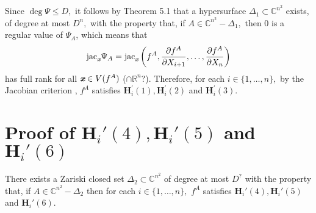 \documentclass[sigconf]{acmart}
\def\xb{\textit{\textbf{x}}}
\def\C{\mathbb{C}}
\def\R{\mathbb{R}}
\def\jac{ \textrm{jac}}
\def\pa{\partial}
\begin{document}
%
Since $\deg \Psi \leq D,$ it follows by Theorem 5.1 that a hypersurface $\Delta_1 \subset \C^{n^2}$ exists, of degree at most $D^n,$ with the property that, if $A \in \C^{n^2}-\Delta_1,$ then $0$ is a regular value of $\Psi_{A}$, which means that 
\[
\jac_\textit{\textbf{x}} \Psi_A 
= \jac_\xb \left(f^A,\frac{\pa f^A}{\pa X_{i+1}},\hdots,\frac{\pa f^A}{\pa X_n}\right)
\] 
has full rank for all $\xb \in V(f^A)$ ($\cap \R^n$?). Therefore, for each $i \in \{1,\hdots,n\},$ by the Jacobian criterion \cite[Theorem 16.19]{ECA}, $f^A$ satisfies $\textbf{H}_i^{'}(1),\textbf{H}_i^{'}(2)$ and $\textbf{H}_i^{'}(3)$.%
%
%
%
\section{Proof of $\textbf{H}_i'(4),\textbf{H}_i'(5)$ and $\textbf{H}_i'(6)$}
%
\begin{theorem}
There exists a Zariski closed set $\Delta_2 \subset \C^{n^2}$ of degree at most $D^{\textrm{?}}$ with the property that, if $A \in \C^{n^2} - \Delta_2$ then for each $i \in \{1,\hdots,n\},$ $f^A$ satisfies $\textbf{H}_i'(4),\textbf{H}_i'(5)$ and $\textbf{H}_i'(6)$.
\end{theorem}
%
\end{document}
